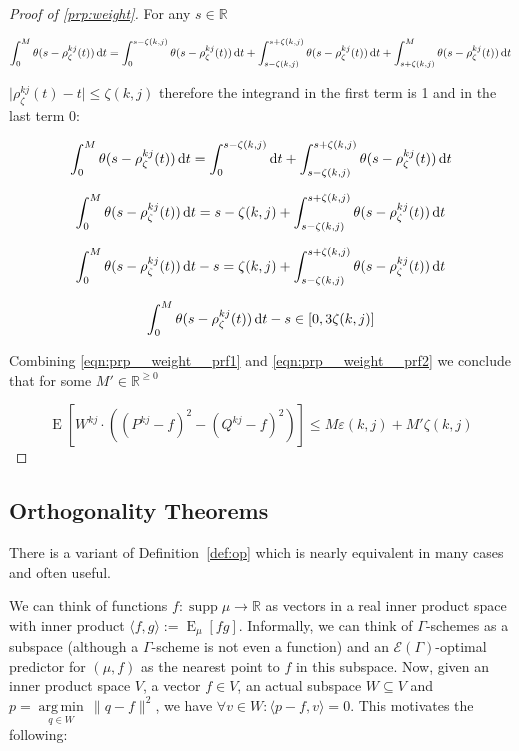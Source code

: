 \documentclass{article}
\numberwithin{equation}{section}
\theoremstyle{definition}
\theoremstyle{plain}
\DeclareMathOperator{\Supp}{supp}
\DeclareMathOperator{\E}{E}
\newcommand{\Argmin}[1]{\underset{#1}{\operatorname{arg\,min}}\,}
\newcommand{\Reals}{\mathbb{R}}
\newcommand{\Abs}[1]{\lvert #1 \rvert}
\newcommand{\Norm}[1]{\lVert #1 \rVert}
\newcommand{\Chev}[1]{\langle #1 \rangle}
\newcommand{\Fall}{\mathcal{E}}
\begin{document}
\begin{proof}[Proof of \ref{prp:weight}]
For any $s \in \Reals$

$$\int_0^M \theta(s-\rho_\zeta^{kj}(t)) \dif t = \int_0^{s-\zeta(k,j)} \theta(s-\rho_\zeta^{kj}(t)) \dif t + \int_{s-\zeta(k,j)}^{s+\zeta(k,j)} \theta(s-\rho_\zeta^{kj}(t)) \dif t + \int_{s+\zeta(k,j)}^M \theta(s-\rho_\zeta^{kj}(t)) \dif t$$

$\Abs{\rho_\zeta^{kj}(t)-t} \leq \zeta(k,j)$ therefore the integrand in the first term is 1 and in the last term 0:

$$\int_0^M \theta(s-\rho_\zeta^{kj}(t)) \dif t = \int_0^{s-\zeta(k,j)} \dif t + \int_{s-\zeta(k,j)}^{s+\zeta(k,j)} \theta(s-\rho_\zeta^{kj}(t)) \dif t$$

$$\int_0^M \theta(s-\rho_\zeta^{kj}(t)) \dif t = s-\zeta(k,j) + \int_{s-\zeta(k,j)}^{s+\zeta(k,j)} \theta(s-\rho_\zeta^{kj}(t)) \dif t$$

$$\int_0^M \theta(s-\rho_\zeta^{kj}(t)) \dif t - s = \zeta(k,j) + \int_{s-\zeta(k,j)}^{s+\zeta(k,j)} \theta(s-\rho_\zeta^{kj}(t)) \dif t$$

\begin{equation}
\label{eqn:prp__weight__prf2}
\int_0^M \theta(s-\rho_\zeta^{kj}(t)) \dif t - s \in [0,3\zeta(k,j)]
\end{equation}

Combining \ref{eqn:prp__weight__prf1} and \ref{eqn:prp__weight__prf2} we conclude that for some $M' \in \Reals^{\geq 0}$

$$\E[W^{kj} \cdot ((P^{kj}-f)^2-(Q^{kj}-f)^2)] \leq M \varepsilon(k,j) + M'\zeta(k,j)$$

\end{proof}

\subsection{Orthogonality Theorems}

There is a variant of Definition~\ref{def:op} which is nearly equivalent in many cases and often useful.

We can think of functions $f: \Supp \mu \rightarrow \Reals$ as vectors in a real inner product space with inner product $\Chev{f,g}:=\E_\mu[fg]$. Informally, we can think of $\Gamma$-schemes as a subspace (although a $\Gamma$-scheme is not even a function) and an $\Fall(\Gamma)$-optimal predictor for $(\mu,f)$ as the nearest point to $f$ in this subspace. Now, given an inner product space $V$, a vector $f \in V$, an actual subspace $W \subseteq V$ and $p = \Argmin{q \in W} \Norm{q - f}^2$, we have $\forall v \in W: \Chev{p-f,v}=0$. This motivates the following:
\end{document}
